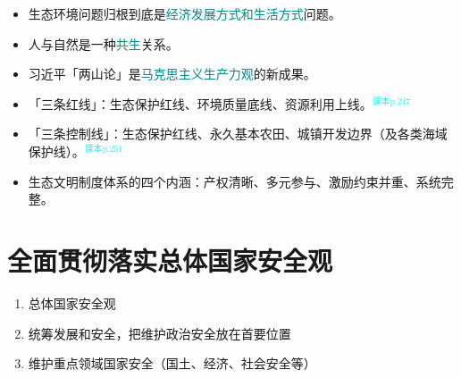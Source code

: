 \documentclass[UTF8]{ctexart}
\begin{document}
\begin{itemize}
  \item 生态环境问题归根到底是\textcolor{darkcyan}{经济发展方式和生活方式}问题。
  \item 人与自然是一种\textcolor{darkcyan}{共生}关系。
  \item 习近平「两山论」是\textcolor{darkcyan}{马克思主义生产力观}的新成果。
  \item 「三条红线」：生态保护红线、环境质量底线、资源利用上线。\textcolor{cyan}{$^{\text{课本p.247}}$}
  \item 「三条控制线」：生态保护红线、永久基本农田、城镇开发边界（及各类海域保护线）。\textcolor{cyan}{$^{\text{课本p.251}}$}
  \item 生态文明制度体系的四个内涵：产权清晰、多元参与、激励约束并重、系统完整。
\end{itemize}



\newpage
\section{全面贯彻落实总体国家安全观}\label{sec:13}
\begin{summary}
\begin{enumerate}
  \item 总体国家安全观
  \item 统筹发展和安全，把维护政治安全放在首要位置
  \item 维护重点领域国家安全（国土、经济、社会安全等）
\end{enumerate}
\end{summary}
\end{document}
